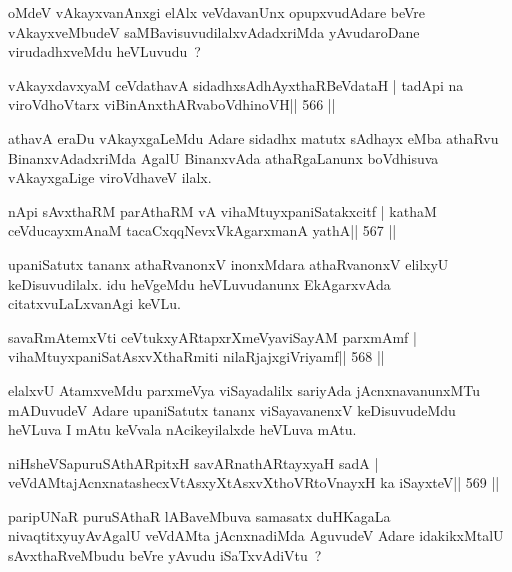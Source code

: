 \begin{artha}
oMdeV vAkayxvanAnxgi elAlx veVdavanUnx opupxvudAdare beVre 
vAkayxveMbudeV
saMBavisuvudilalxvAdadxriMda yAvudaroDane virudadhxveMdu heVLuvudu~?
\end{artha}

\begin{shl}
vAkayxdavxyaM ceVdathavA sidadhxsAdhAyxthaRBeVdataH |
tadA\s pi na viroVdhoV\s tarx viBinAnxthARvaboVdhinoVH\hfill || 566 ||
\end{shl}

\begin{artha}
athavA eraDu vAkayxgaLeMdu Adare sidadhx matutx sAdhayx eMba athaRvu BinanxvAdadxriMda AgalU BinanxvAda athaRgaLanunx boVdhisuva vAkayxgaLige viroVdhaveV ilalx.
\end{artha}

\begin{shl}
nApi sAvxthaRM parAthaRM vA vihaMtuyxpaniSatakxcitf |
kathaM ceVducayxmAnaM tacaCxqqNevxVkAgarxmanA yathA\hfill || 567 ||
\end{shl}

\begin{artha}
upaniSatutx tananx athaRvanonxV inonxMdara athaRvanonxV elilxyU keDisuvudilalx. idu heVgeMdu heVLuvudanunx EkAgarxvAda citatxvuLaLxvanAgi keVLu.
\end{artha}

\begin{shl}
savaRmAtemxVti ceVtukxyARtapxrXmeVyaviSayAM parxmAmf |
vihaMtuyxpaniSatAsxvXthaRmiti nilaRjajxgiVriyamf\hfill || 568 ||
\end{shl}

\begin{artha}
elalxvU AtamxveMdu parxmeVya viSayadalilx sariyAda jAcnxnavanunxMTu mADuvudeV Adare upaniSatutx tananx viSayavanenxV keDisuvudeMdu heVLuva I mAtu keVvala nAcikeyilalxde heVLuva mAtu.
\end{artha}

\begin{shl}
niHsheVSapuruSAthARpitxH savARnathARtayxyaH sadA |
veVdAMtajAcnxnatashecxVtAsxyXtAsxvXthoVR\s toV\s nayxH ka iSayxteV\hfill || 569 ||
\end{shl}

\begin{artha}
paripUNaR puruSAthaR lABaveMbuva samasatx duHKagaLa nivaqtitxyu\break yAvAgalU
veVdAMta jAcnxnadiMda AguvudeV Adare idakikxMtalU sAvxthaRveMbudu
beVre yAvudu iSaTxvAdiVtu~?
\end{artha}

